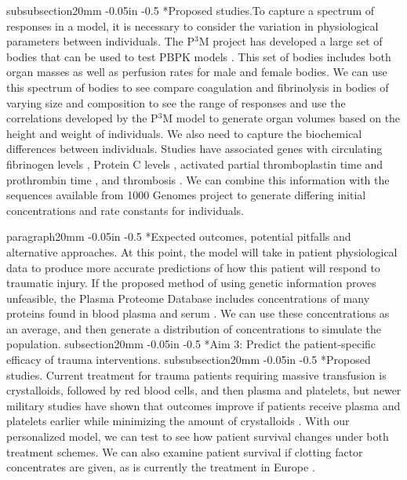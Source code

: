 \documentclass[11pt]{article}
\makeatletter
\renewcommand\subsection{\@startsection
	{subsection}{2}{0mm}
	{-0.05in}
	{-0.5\baselineskip}
	{\normalfont\normalsize\bfseries}}
\renewcommand\subsubsection{\@startsection
	{subsubsection}{2}{0mm}
	{-0.05in}
	{-0.5\baselineskip}
	{\normalfont\normalsize\bfseries}}
\renewcommand\paragraph{\@startsection
  {paragraph}{2}{0mm}
  {-0.05in}
  {-0.5\baselineskip}
  {\normalfont\normalsize\itshape}}
\makeatother
\begin{document}
\subsubsection*{Proposed studies.}To capture a spectrum of responses in a model, it is necessary to consider the variation in physiological parameters between individuals. The P$^3$M project has developed a large set of bodies that can be used to test PBPK models \citep{price2003modeling}. This set of bodies includes both organ masses as well as perfusion rates for male and female bodies. We can use this spectrum of bodies to see compare coagulation and fibrinolysis in bodies of varying size and composition to see the range of responses and use the correlations developed by the P$^3$M model to generate organ volumes based on the height and weight of individuals.
We also need to capture the biochemical differences between individuals. Studies have associated genes with circulating fibrinogen levels \cite{dehghan2009association}, Protein C levels \cite{russell2003genetics}, activated partial thromboplastin time and prothrombin time \cite{tang2012genetic}, and thrombosis \cite{lane1996inherited}. We can combine this information with the sequences available from 1000 Genomes project to generate differing initial concentrations and rate constants for individuals. 

\paragraph*{Expected outcomes, potential pitfalls and alternative approaches.} At this point, the model will take in patient physiological data to produce more accurate predictions of how this patient will respond to traumatic injury.  
If the proposed method of using genetic information proves unfeasible, the Plasma Proteome Database includes concentrations of many proteins found in blood plasma and serum \cite{nanjappa2013plasma}. We can use these concentrations as an average, and then generate a distribution of concentrations to simulate the population.
\subsection*{Aim 3: Predict the patient-specific efficacy of trauma interventions.}
\subsubsection*{Proposed studies.}
Current treatment for trauma patients requiring massive transfusion is crystalloids, followed by red blood cells, and then plasma and platelets, but newer military studies have shown that outcomes improve if patients receive plasma and platelets earlier while minimizing the amount of crystalloids \cite{holcomb2008increased}. With our personalized model, we can test to see how patient survival changes under both treatment schemes. We can also examine patient survival if clotting factor concentrates are given, as is currently the treatment in Europe \citep{hunt2014bleeding}.
\end{document}
